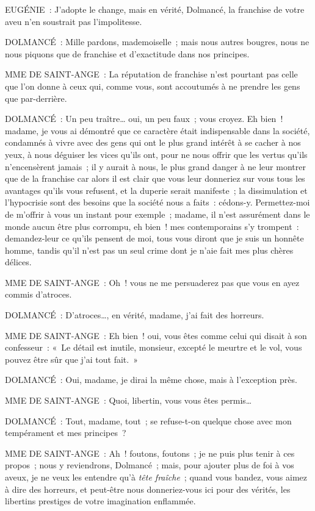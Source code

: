 \documentclass[french,twoside]{book} %
\begin{document}
EUGÉNIE : J’adopte le change, mais en vérité, Dolmancé, la franchise de votre aveu n’en soustrait pas l’impolitesse.\par
DOLMANCÉ : Mille pardons, mademoiselle ; mais nous autres bougres, nous ne nous piquons que de franchise et d’exactitude dans nos principes.\par
MME DE SAINT-ANGE : La réputation de franchise n’est pourtant pas celle que l’on donne à ceux qui, comme vous, sont accoutumés à ne prendre les gens que par-derrière.\par
DOLMANCÉ : Un peu traître… oui, un peu faux ; vous croyez. Eh bien ! madame, je vous ai démontré que ce caractère était indispensable dans la société, condamnés à vivre avec des gens qui ont le plus grand intérêt à se cacher à nos yeux, à nous déguiser les vices qu’ils ont, pour ne nous offrir que les vertus qu’ils n’encensèrent jamais ; il y aurait à nous, le plus grand danger à ne leur montrer que de la franchise car alors il est clair que vous leur donneriez sur vous tous les avantages qu’ils vous refusent, et la duperie serait manifeste ; la dissimulation et l’hypocrisie sont des besoins que la société nous a faits : cédons-y. Permettez-moi de m’offrir à vous un instant pour exemple ; madame, il n’est assurément dans le monde aucun être plus corrompu, eh bien ! mes contemporains s’y trompent : demandez-leur ce qu’ils pensent de moi, tous vous diront que je suis un honnête homme, tandis qu’il n’est pas un seul crime dont je n’aie fait mes plus chères délices.\par
MME DE SAINT-ANGE : Oh ! vous ne me persuaderez pas que vous en ayez commis d’atroces.\par
DOLMANCÉ : D’atroces…, en vérité, madame, j’ai fait des horreurs.\par
MME DE SAINT-ANGE : Eh bien ! oui, vous êtes comme celui qui disait à son confesseur : « Le détail est inutile, monsieur, excepté le meurtre et le vol, vous pouvez être sûr que j’ai tout fait. »\par
DOLMANCÉ : Oui, madame, je dirai la même chose, mais à l’exception près.\par
MME DE SAINT-ANGE : Quoi, libertin, vous vous êtes permis…\par
DOLMANCÉ : Tout, madame, tout ; se refuse-t-on quelque chose avec mon tempérament et mes principes ?\par
MME DE SAINT-ANGE : Ah ! foutons, foutons ; je ne puis plus tenir à ces propos ; nous y reviendrons, Dolmancé ; mais, pour ajouter plus de foi à vos aveux, je ne veux les entendre qu’à {\itshape tête fraîche} ; quand vous bandez, vous aimez à dire des horreurs, et peut-être nous donneriez-vous ici pour des vérités, les libertins prestiges de votre imagination enflammée.\par
\end{document}
